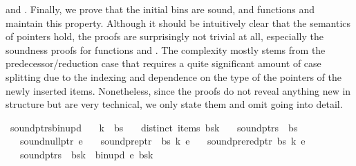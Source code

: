 \begin{isabellebody}
\begin{isamarkuptext}
and . Finally, we prove that the initial bins are sound, and functions 
and  maintain this property. Although it should be intuitively clear that the
semantics of pointers hold, the proofs are surprisingly not trivial at all, especially the soundness
proofs for functions  and . The complexity mostly stems from
the predecessor/reduction case that requires a quite significant amount of case splitting due to the indexing and dependence
on the type of the pointers of the newly inserted items. Nonetheless, since the proofs do not reveal anything new in structure
but are very technical, we only state them and omit going into detail.%
\end{isamarkuptext}\isamarkuptrue%
\isamarkupfalse%
\ sound{\isacharunderscore}{\kern0pt}ptrs{\isacharunderscore}{\kern0pt}bin{\isacharunderscore}{\kern0pt}upd{\isacharcolon}{\kern0pt}\isanewline
\ \ \ {\isachardoublequoteopen}k\ {\isacharless}{\kern0pt}\ {\isacharbar}{\kern0pt}bs{\isacharbar}{\kern0pt}{\isachardoublequoteclose}\isanewline
\ \ \ {\isachardoublequoteopen}distinct\ {\isacharparenleft}{\kern0pt}items\ {\isacharparenleft}{\kern0pt}bs{\isacharbang}{\kern0pt}k{\isacharparenright}{\kern0pt}{\isacharparenright}{\kern0pt}{\isachardoublequoteclose}\isanewline
\ \ \ {\isachardoublequoteopen}sound{\isacharunderscore}{\kern0pt}ptrs\ {\isasymomega}\ bs{\isachardoublequoteclose}\isanewline
\ \ \ {\isachardoublequoteopen}sound{\isacharunderscore}{\kern0pt}null{\isacharunderscore}{\kern0pt}ptr\ e{\isachardoublequoteclose}\isanewline
\ \ \ {\isachardoublequoteopen}sound{\isacharunderscore}{\kern0pt}pre{\isacharunderscore}{\kern0pt}ptr\ {\isasymomega}\ bs\ k\ e{\isachardoublequoteclose}\isanewline
\ \ \ {\isachardoublequoteopen}sound{\isacharunderscore}{\kern0pt}prered{\isacharunderscore}{\kern0pt}ptr\ bs\ k\ e{\isachardoublequoteclose}\isanewline
\ \ \ {\isachardoublequoteopen}sound{\isacharunderscore}{\kern0pt}ptrs\ {\isasymomega}\ {\isacharparenleft}{\kern0pt}bs{\isacharbrackleft}{\kern0pt}k\ {\isacharcolon}{\kern0pt}{\isacharequal}{\kern0pt}\ bin{\isacharunderscore}{\kern0pt}upd\ e\ {\isacharparenleft}{\kern0pt}bs{\isacharbang}{\kern0pt}k{\isacharparenright}{\kern0pt}{\isacharbrackright}{\kern0pt}{\isacharparenright}{\kern0pt}{\isachardoublequoteclose}%

\end{isabellebody}
